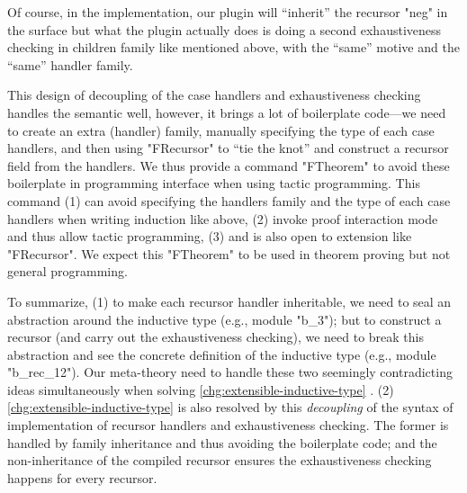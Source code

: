 Of course, in the implementation, our plugin will ``inherit'' the
recursor "neg" in the surface 
but what the plugin actually does is doing a second exhaustiveness
checking in children family like mentioned above, with the ``same'' motive and the ``same'' handler family.



 







This design of decoupling of the case handlers and exhaustiveness checking handles the semantic well, however, it brings a lot of boilerplate code---we need to create an extra (handler) family, manually specifying the type of each case handlers, and then using "FRecursor" to ``tie the knot'' and construct a recursor field from the handlers.  
We thus provide a command "FTheorem" to avoid these boilerplate in programming interface when using tactic programming. 
This command (1) can avoid specifying the handlers family and the type of each case handlers when writing induction like above, (2) invoke
proof interaction mode and thus allow tactic programming, (3) and is also open to extension like "FRecursor". We expect this "FTheorem" to be used in theorem proving but not general programming. 

To summarize, (1) to make each recursor
handler inheritable, we need to seal an abstraction around the inductive
type (e.g., module "b_3"); but to construct a recursor (and carry out the
exhaustiveness checking), we need to break this abstraction and see the
concrete definition of the inductive type (e.g., module "b_rec_12"). Our
meta-theory need to handle these two seemingly contradicting ideas
simultaneously when solving \ref{chg:extensible-inductive-type} . (2) \ref{chg:extensible-inductive-type} is also resolved by this \textit{decoupling} of the syntax of implementation of recursor handlers and exhaustiveness checking. The former is handled by family inheritance and thus avoiding the boilerplate code; and the non-inheritance of the compiled recursor ensures the exhaustiveness checking happens for every recursor.  


